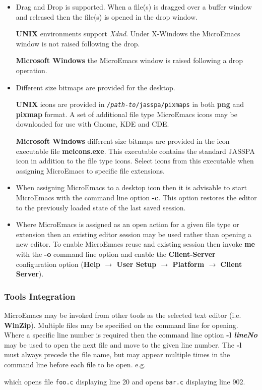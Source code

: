 \documentclass[11pt,a4paper,pdftex]{article}
\begin{document}
  \begin{itemize}

    \item Drag and Drop is supported. When a file(s) is dragged over a buffer
    window and released then the file(s) is opened in the drop window. 
    
    \textbf{UNIX} environments support \textit{Xdnd}. Under X-Windows the
    MicroEmacs window is not raised following the drop.
    
    \textbf{Microsoft Windows} the MicroEmacs window is raised following
    a drop operation.

    \item Different size bitmaps are provided for the desktop. 
    
    \textbf{UNIX} icons are provided in
    \texttt{\textit{/path-to}/jasspa/pixmaps} in both \textbf{png} and
    \textbf{pixmap} format. A set of additional file type MicroEmacs icons may
    be downloaded for use with Gnome, KDE and CDE.

    \textbf{Microsoft Windows}  different size bitmaps are provided in the icon executable file
    \textbf{meicons.exe}. This executable contains the standard JASSPA icon in
    addition to the file type icons. Select icons from this executable when 
    assigning MicroEmacs to specific file extensions. 

    \item When assigning MicroEmacs to a desktop icon then it is advisable to
    start MicroEmacs with the command line option \textbf{-c}. This option
    restores the editor to the previously loaded state of the last saved
    session.

    \item Where MicroEmacs is assigned as an open action for a given file type
    or extension then an existing editor session may be used rather than
    opening a new editor. To enable MicroEmacs reuse and existing session then
    invoke \textbf{me} with the \textbf{-o} command line option and enable the
    \textbf{Client-Server} configuration option (\textbf{Help $\rightarrow$
    User Setup $\rightarrow$ Platform $\rightarrow$ Client Server}). 
    
  \end{itemize}

\subsubsection{Tools Integration}
    
  MicroEmacs may be invoked from other tools as the selected text editor (i.e.
  \textbf{WinZip}). Multiple files may be specified on the command line for
  opening. Where a specific line number is required then the command line
  option \textbf{-l \textit{lineNo}} may be used to open the next file and
  move to the given line number. The \textbf{-l} must always precede the file
  name, but may appear multiple times in the command line before  each file 
  to be open. e.g.
  

  which opens file \texttt{foo.c} displaying line 20 and opens \texttt{bar.c} 
  displaying line 902.
     
\end{document}
